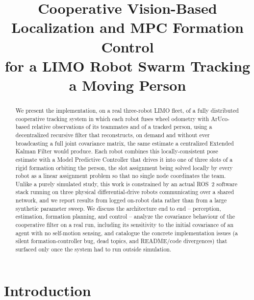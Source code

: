 \documentclass[10pt,conference]{IEEEtran}
\begin{document}
\title{Cooperative Vision-Based Localization and MPC Formation Control\\ for a LIMO Robot Swarm Tracking a Moving Person}

\author{
}

\maketitle

\begin{abstract}
We present the implementation, on a real three-robot LIMO fleet, of a fully distributed
cooperative tracking system in which each robot fuses wheel odometry with ArUco-based relative
observations of its teammates and of a tracked person, using a decentralized recursive filter
that reconstructs, on demand and without ever broadcasting a full joint covariance matrix, the
same estimate a centralized Extended Kalman Filter would produce. Each robot combines this
locally-consistent pose estimate with a Model Predictive Controller that drives it into one of
three slots of a rigid formation orbiting the person, the slot assignment being solved locally
by every robot as a linear assignment problem so that no single node coordinates the team. Unlike
a purely simulated study, this work is constrained by an actual ROS~2 software stack running on
three physical differential-drive robots communicating over a shared network, and we report
results from logged on-robot data rather than from a large synthetic parameter sweep. We discuss
the architecture end to end -- perception, estimation, formation planning, and control -- analyze
the covariance behaviour of the cooperative filter on a real run, including its sensitivity to
the initial covariance of an agent with no self-motion sensing, and catalogue the concrete
implementation issues (a silent formation-controller bug, dead topics, and README/code
divergences) that surfaced only once the system had to run outside simulation.
\end{abstract}

\section{Introduction}
\end{document}
